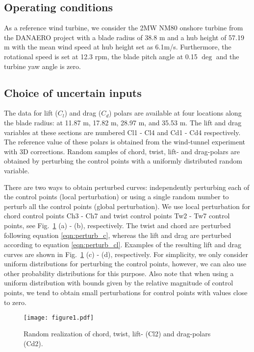 \subsection{Operating conditions}
As a reference wind turbine, we consider the 2MW NM80 onshore turbine from the DANAERO project \cite{Troldborg2013} with a blade radius of 38.8 m and a hub height of 57.19 m with the mean wind speed at hub height set as 6.1m/s. Furthermore, the rotational speed is set at 12.3 rpm, the blade pitch angle at 0.15 $\deg$ and the turbine yaw angle is zero.

\subsection{Choice of uncertain inputs}
The data for lift ($C_l$) and drag ($C_d$) polars are available at four locations along the blade radius: at 11.87 m, 17.82 m, 28.97 m, and 35.53 m. The lift and drag variables at these sections are numbered Cl1 - Cl4 and Cd1 - Cd4 respectively. The reference value of these polars is obtained from the wind-tunnel experiment with 3D corrections. Random samples of chord, twist, lift- and drag-polars are obtained by perturbing the control points with a uniformly distributed random variable.  

There are two ways to obtain perturbed curves: independently perturbing each of the control points (local perturbation) or using a single random number to perturb all the control points (global perturbation). We use local perturbation for chord control points Ch3 - Ch7 and twist control points Tw2 - Tw7 control points, see Fig.\ \ref{perturbed_samples} (a) - (b), respectively. The twist and chord are perturbed following equation \eqref{eqn:perturb_c}, whereas the lift and drag are perturbed according to equation \eqref{eqn:perturb_cl}. Examples of the resulting lift and drag curves are shown in Fig.\ \ref{perturbed_samples} (c) - (d), respectively. For simplicity, we only consider uniform distributions for perturbing the control points, however, we can also use other probability distributions for this purpose. Also note that when using a uniform distribution with bounds given by the relative magnitude of control points, we tend to obtain small perturbations for control points with values close to zero. 
\begin{figure}[ht!]
\centering
\texttt{[image: figure1.pdf]}
\caption{Random realization of chord, twist, lift- (Cl2) and drag-polars (Cd2).}
\label{perturbed_samples}
\end{figure}

